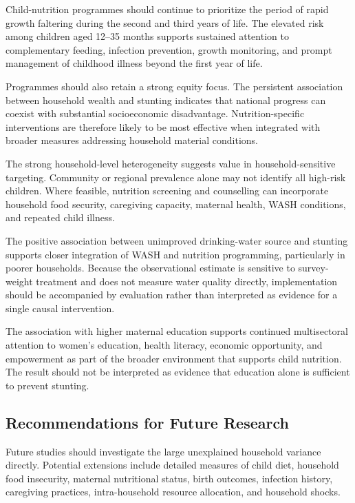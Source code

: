 Child-nutrition programmes should continue to prioritize the period of rapid growth faltering during the second and third years of life. The elevated risk among children aged 12--35 months supports sustained attention to complementary feeding, infection prevention, growth monitoring, and prompt management of childhood illness beyond the first year of life.

Programmes should also retain a strong equity focus. The persistent association between household wealth and stunting indicates that national progress can coexist with substantial socioeconomic disadvantage. Nutrition-specific interventions are therefore likely to be most effective when integrated with broader measures addressing household material conditions.

The strong household-level heterogeneity suggests value in household-sensitive targeting. Community or regional prevalence alone may not identify all high-risk children. Where feasible, nutrition screening and counselling can incorporate household food security, caregiving capacity, maternal health, WASH conditions, and repeated child illness.

The positive association between unimproved drinking-water source and stunting supports closer integration of WASH and nutrition programming, particularly in poorer households. Because the observational estimate is sensitive to survey-weight treatment and does not measure water quality directly, implementation should be accompanied by evaluation rather than interpreted as evidence for a single causal intervention.

The association with higher maternal education supports continued multisectoral attention to women's education, health literacy, economic opportunity, and empowerment as part of the broader environment that supports child nutrition. The result should not be interpreted as evidence that education alone is sufficient to prevent stunting.

\subsection{Recommendations for Future Research}

Future studies should investigate the large unexplained household variance directly. Potential extensions include detailed measures of child diet, household food insecurity, maternal nutritional status, birth outcomes, infection history, caregiving practices, intra-household resource allocation, and household shocks.

